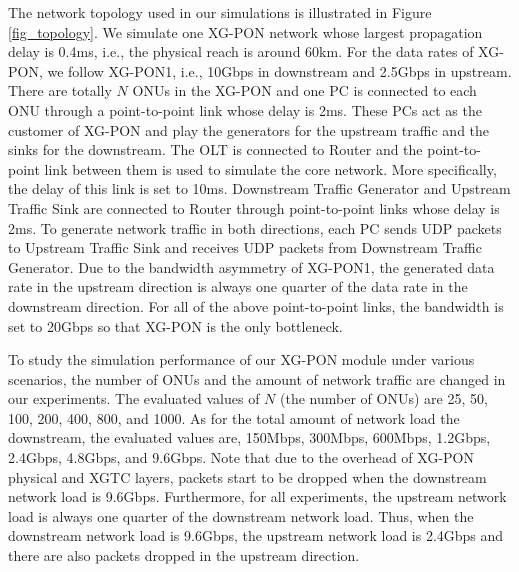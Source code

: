 The network topology used in our simulations is illustrated in
Figure \ref{fig_topology}. We simulate one XG-PON network whose
largest propagation delay is 0.4ms, i.e., the physical reach is
around 60km. For the data rates of XG-PON, we follow XG-PON1,
i.e., 10Gbps in downstream and 2.5Gbps in upstream. There are
totally $N$ ONUs in the XG-PON and one PC is connected to each ONU
through a point-to-point link whose delay is 2ms. These PCs act as
the customer of XG-PON and play the generators for the upstream
traffic and the sinks for the downstream. The OLT is connected to
Router and the point-to-point link between them is used to
simulate the core network. More specifically, the delay of this
link is set to 10ms. Downstream Traffic Generator and Upstream
Traffic Sink are connected to Router through point-to-point links
whose delay is 2ms. To generate network traffic in both
directions, each PC sends UDP packets to Upstream Traffic Sink and
receives UDP packets from Downstream Traffic Generator. Due to the
bandwidth asymmetry of XG-PON1, the generated data rate in the
upstream direction is always one quarter of the data rate in the
downstream direction. For all of the above point-to-point links,
the bandwidth is set to 20Gbps so that XG-PON is the only
bottleneck.

To study the simulation performance of our XG-PON module under
various scenarios, the number of ONUs and the amount of network
traffic are changed in our experiments. The evaluated values of
$N$ (the number of ONUs) are  25, 50, 100, 200, 400, 800, and
1000. As for the total amount of network load the downstream, the
evaluated values are, 150Mbps, 300Mbps, 600Mbps, 1.2Gbps, 2.4Gbps,
4.8Gbps, and 9.6Gbps. Note that due to the overhead of XG-PON
physical and XGTC layers, packets start to be dropped when the
downstream network load is 9.6Gbps. Furthermore, for all
experiments, the upstream network load is always one quarter of
the downstream network load. Thus, when the downstream network
load is 9.6Gbps, the upstream network load is 2.4Gbps and there
are also packets dropped in the upstream direction.




